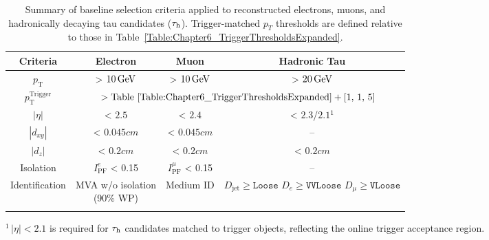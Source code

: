 {
\setlength{\arrayrulewidth}{1pt}

\begin{table}[h]
\centering
\caption[Summary of baseline object selection criteria]{
Summary of baseline selection criteria applied to reconstructed electrons, muons, and hadronically decaying tau candidates ($\tau_\mathrm{h}$). Trigger-matched $p_T$ thresholds are defined relative to those in Table~\ref{Table:Chapter6_TriggerThresholdsExpanded}.
}
\label{Table:Chapter6_ObjectSelectionSummary}

\renewcommand{\arraystretch}{1.5}
\setlength{\tabcolsep}{12pt}

\begin{tabular}{cccc}
\hline
\textbf{Criteria} & \textbf{Electron} & \textbf{Muon} & \textbf{Hadronic Tau} \\
\hline

$p_\text{T}$  & > $10\,\text{Ge\hspace{-.08em}V}$ & > $10\,\text{Ge\hspace{-.08em}V}$ & > $20\,\text{Ge\hspace{-.08em}V}$\\ 
\arrayrulecolor{lightgray} \hline

$p_\text{T}^{\text{Trigger}}$ & \multicolumn{3}{c}{$> \text{Table~\ref{Table:Chapter6_TriggerThresholdsExpanded}} + [1,\,1,\,5]$} \\
\arrayrulecolor{lightgray} \hline

$|\eta|$ & < $2.5$ & < $2.4$ & < $2.3$/$2.1$\hyperlink{DoubleTauTrigger-EtaCut}{$^1$} \\
\arrayrulecolor{lightgray} \hline

$|d_{xy}|$ & < $0.045\unit{cm}$ & < $0.045\unit{cm}$ & -- \\
\arrayrulecolor{lightgray} \hline

$|d_z|$ & < $0.2\unit{cm}$ & < $0.2\unit{cm}$ & < $0.2\unit{cm}$ \\
\arrayrulecolor{lightgray} \hline

Isolation & $I^e_\text{PF}$ < 0.15 & $I^\mu_\text{PF}$ < 0.15 & -- \\
\arrayrulecolor{lightgray} \hline

Identification
& \makecell{MVA w/o isolation\\(90\% WP)}
& Medium ID
& \makecell{
$D_{\text{jet}} \geq \texttt{Loose}$ \\
$D_{e} \geq \texttt{VVLoose}$ \\
$D_{\mu} \geq \texttt{VLoose}$
} \\
\arrayrulecolor{black} \hline
\end{tabular}
\vspace{0.5em}
\begin{minipage}{0.95\linewidth}
\raggedright
\footnotesize\hypertarget{DoubleTauTrigger-EtaCut}{}$^{1}$\,$|\eta| < 2.1$ is required for $\tau_\mathrm{h}$ candidates matched to trigger objects, reflecting the online trigger acceptance region.
\end{minipage}

\end{table}
}

